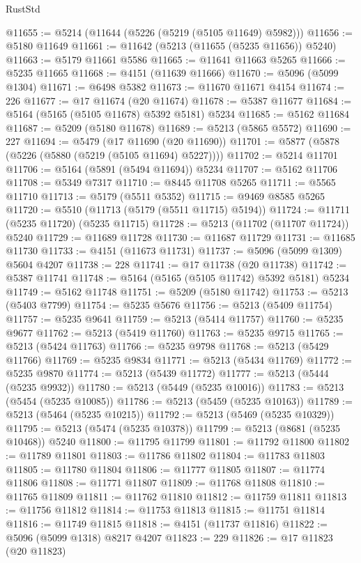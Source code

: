 \begin{lexlean}{RustStd}
\begin{coremodule}
@11655 := @5214 (@11644 (@5226 (@5219 (@5105 @11649) @5982)))
@11656 := @5180 @11649
@11661 := @11642 (@5213 (@11655 (@5235 @11656)) @5240)
@11663 := @5179 @11661 @5586
@11665 := @11641 @11663 @5265
@11666 := @5235 @11665
@11668 := @4151 (@11639 @11666)
@11670 := @5096 (@5099 @1304)
@11671 := @6498 @5382
@11673 := @11670 @11671 @4154
@11674 := 226
@11677 := @17 @11674 (@20 @11674)
@11678 := @5387 @11677
@11684 := @5164 (@5165 (@5105 @11678) @5392 @5181) @5234
@11685 := @5162 @11684
@11687 := @5209 (@5180 @11678)
@11689 := @5213 (@5865 @5572)
@11690 := 227
@11694 := @5479 (@17 @11690 (@20 @11690))
@11701 := @5877 (@5878 (@5226 (@5880 (@5219 (@5105 @11694) @5227))))
@11702 := @5214 @11701
@11706 := @5164 (@5891 (@5494 @11694)) @5234
@11707 := @5162 @11706
@11708 := @5349 @7317
@11710 := @8445 @11708 @5265
@11711 := @5565 @11710
@11713 := @5179 (@5511 @5352)
@11715 := @9469 @8585 @5265
@11720 := @5510 (@11713 (@5179 (@5511 @11715) @5194))
@11724 := @11711 (@5235 @11720) (@5235 @11715)
@11728 := @5213 (@11702 (@11707 @11724)) @5240
@11729 := @11689 @11728
@11730 := @11687 @11729
@11731 := @11685 @11730
@11733 := @4151 (@11673 @11731)
@11737 := @5096 (@5099 @1309) @5604 @4207
@11738 := 228
@11741 := @17 @11738 (@20 @11738)
@11742 := @5387 @11741
@11748 := @5164 (@5165 (@5105 @11742) @5392 @5181) @5234
@11749 := @5162 @11748
@11751 := @5209 (@5180 @11742)
@11753 := @5213 (@5403 @7799)
@11754 := @5235 @5676
@11756 := @5213 (@5409 @11754)
@11757 := @5235 @9641
@11759 := @5213 (@5414 @11757)
@11760 := @5235 @9677
@11762 := @5213 (@5419 @11760)
@11763 := @5235 @9715
@11765 := @5213 (@5424 @11763)
@11766 := @5235 @9798
@11768 := @5213 (@5429 @11766)
@11769 := @5235 @9834
@11771 := @5213 (@5434 @11769)
@11772 := @5235 @9870
@11774 := @5213 (@5439 @11772)
@11777 := @5213 (@5444 (@5235 @9932))
@11780 := @5213 (@5449 (@5235 @10016))
@11783 := @5213 (@5454 (@5235 @10085))
@11786 := @5213 (@5459 (@5235 @10163))
@11789 := @5213 (@5464 (@5235 @10215))
@11792 := @5213 (@5469 (@5235 @10329))
@11795 := @5213 (@5474 (@5235 @10378))
@11799 := @5213 (@8681 (@5235 @10468)) @5240
@11800 := @11795 @11799
@11801 := @11792 @11800
@11802 := @11789 @11801
@11803 := @11786 @11802
@11804 := @11783 @11803
@11805 := @11780 @11804
@11806 := @11777 @11805
@11807 := @11774 @11806
@11808 := @11771 @11807
@11809 := @11768 @11808
@11810 := @11765 @11809
@11811 := @11762 @11810
@11812 := @11759 @11811
@11813 := @11756 @11812
@11814 := @11753 @11813
@11815 := @11751 @11814
@11816 := @11749 @11815
@11818 := @4151 (@11737 @11816)
@11822 := @5096 (@5099 @1318) @8217 @4207
@11823 := 229
@11826 := @17 @11823 (@20 @11823)

\end{coremodule}
\end{lexlean}
